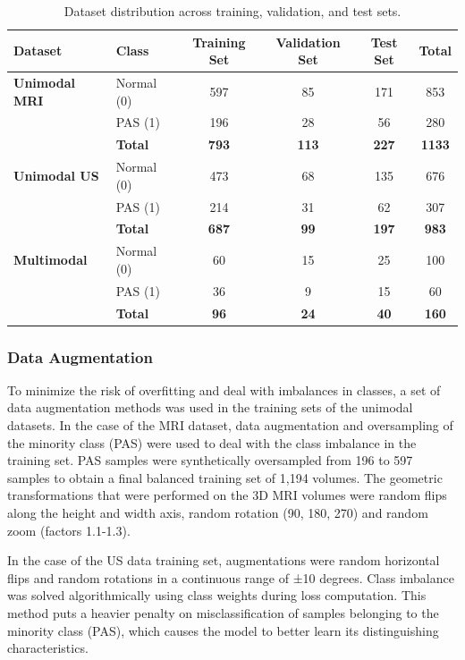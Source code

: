 \documentclass[12pt]{article}
\begin{document}
\begin{table}[h!]
\centering
\caption{Dataset distribution across training, validation, and test sets.}
\label{tab:dataset_summary}
\begin{tabular}{l l c c c c}
\hline
\textbf{Dataset} & \textbf{Class} & \textbf{Training Set} & \textbf{Validation Set} & \textbf{Test Set} & \textbf{Total} \\
\hline
\textbf{Unimodal MRI} & Normal (0) & 597 & 85 & 171 & 853 \\
 & PAS (1) & 196 & 28 & 56 & 280 \\
 & \textbf{Total} & \textbf{793} & \textbf{113} & \textbf{227} & \textbf{1133} \\
\hline
\textbf{Unimodal US} & Normal (0) & 473 & 68 & 135 & 676 \\
 & PAS (1) & 214 & 31 & 62 & 307 \\
 & \textbf{Total} & \textbf{687} & \textbf{99} & \textbf{197} & \textbf{983} \\
\hline
\textbf{Multimodal} & Normal (0) & 60 & 15 & 25 & 100 \\
 & PAS (1) & 36 & 9 & 15 & 60 \\
 & \textbf{Total} & \textbf{96} & \textbf{24} & \textbf{40} & \textbf{160} \\
\hline
\end{tabular}
\end{table}

\subsubsection{Data Augmentation}

To minimize the risk of overfitting and deal with imbalances in classes, a set of data augmentation methods was used in the training sets of the unimodal datasets. In the case of the MRI dataset, data augmentation and oversampling of the minority class (PAS) were used to deal with the class imbalance in the training set. PAS samples were synthetically oversampled from 196 to 597 samples to obtain a final balanced training set of 1,194 volumes. The geometric transformations that were performed on the 3D MRI volumes were random flips along the height and width axis, random rotation (90\textdegree, 180\textdegree, 270\textdegree) and random zoom (factors 1.1-1.3).

In the case of the US data training set, augmentations were random horizontal flips and random rotations in a continuous range of ±10 degrees. Class imbalance was solved algorithmically using class weights during loss computation. This method puts a heavier penalty on misclassification of samples belonging to the minority class (PAS), which causes the model to better learn its distinguishing characteristics.
\end{document}
